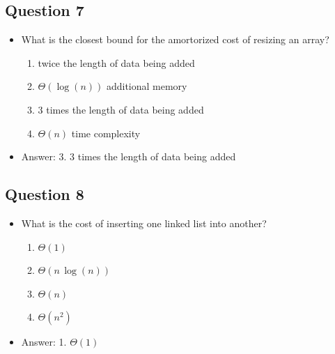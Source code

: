 \begin{slide}
\section[-1]{Question 7}

\begin{PauseHighLight}
  \begin{itemize}
  \item What is the closest bound for the amortorized cost of resizing an array?
    \begin{enumerate}
    \item twice the length of data being added
    \item $\Theta(\log(n))$ additional memory
    \item 3 times the length of data being added
    \item $\Theta(n)$ time complexity\pause
    \end{enumerate}
  \item Answer: 3. 3 times the length of data being added\pauseb
  \end{itemize}
\end{PauseHighLight}
\end{slide}

\begin{slide}
\section[-1]{Question 8}

\begin{PauseHighLight}
  \begin{itemize}
  \item What is the cost of inserting one linked list into another?
    \begin{enumerate}
    \item $\Theta(1)$
    \item $\Theta(n\,\log(n))$
    \item $\Theta(n)$
    \item $\Theta(n^2)$\pause
    \end{enumerate}
  \item Answer: 1. $\Theta(1)$\pauseb
  \end{itemize}
\end{PauseHighLight}
\end{slide}

